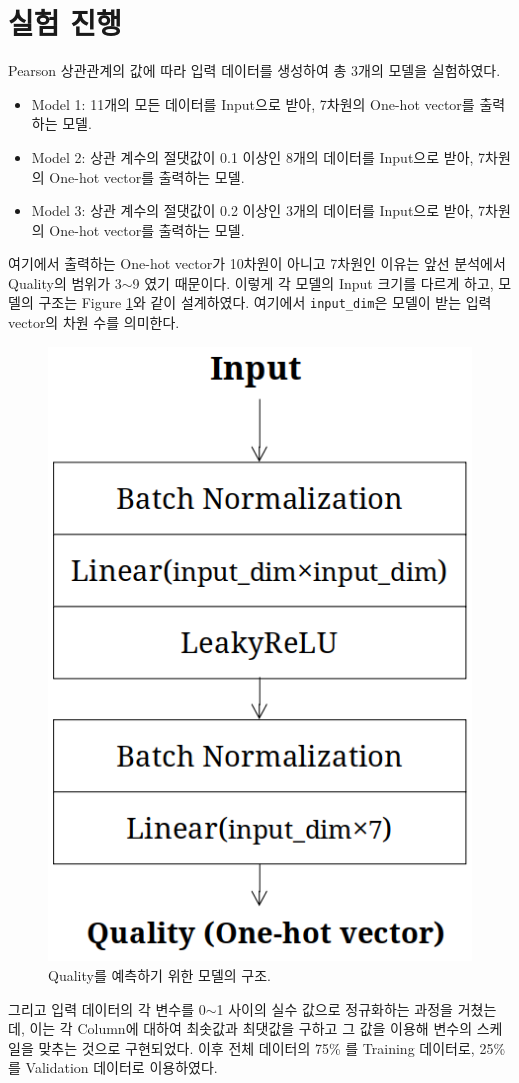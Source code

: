 \documentclass[letterpaper,10pt]{article}
\begin{document}
	\section{실험 진행}
	
	Pearson 상관관계의 값에 따라 입력 데이터를 생성하여 총 3개의 모델을 실험하였다.
	
	\begin{itemize}
		\item Model 1: 11개의 모든 데이터를 Input으로 받아, 7차원의 One-hot vector를 출력하는 모델.
		\item Model 2: 상관 계수의 절댓값이 0.1 이상인 8개의 데이터를 Input으로 받아, 7차원의 One-hot vector를 출력하는 모델.
		\item Model 3: 상관 계수의 절댓값이 0.2 이상인 3개의 데이터를 Input으로 받아, 7차원의 One-hot vector를 출력하는 모델.
	\end{itemize}

	여기에서 출력하는 One-hot vector가 10차원이 아니고 7차원인 이유는 앞선 분석에서 Quality의 범위가 3$\sim$9 였기 때문이다. 이렇게 각 모델의 Input 크기를 다르게 하고, 모델의 구조는 Figure \ref{fig:model}와 같이 설계하였다. 여기에서 \verb|input_dim|은 모델이 받는 입력 vector의 차원 수를 의미한다.
	
	\begin{figure}[h]
		\centering
		\includegraphics[width=0.3\linewidth]{images/model.png}
		\caption{Quality를 예측하기 위한 모델의 구조.}
		\label{fig:model}
	\end{figure}

	그리고 입력 데이터의 각 변수를 0$\sim$1 사이의 실수 값으로 정규화하는 과정을 거쳤는데, 이는 각 Column에 대하여 최솟값과 최댓값을 구하고 그 값을 이용해 변수의 스케일을 맞추는 것으로 구현되었다. 이후 전체 데이터의 75\% 를 Training 데이터로, 25\% 를 Validation 데이터로 이용하였다.
	
\end{document}
